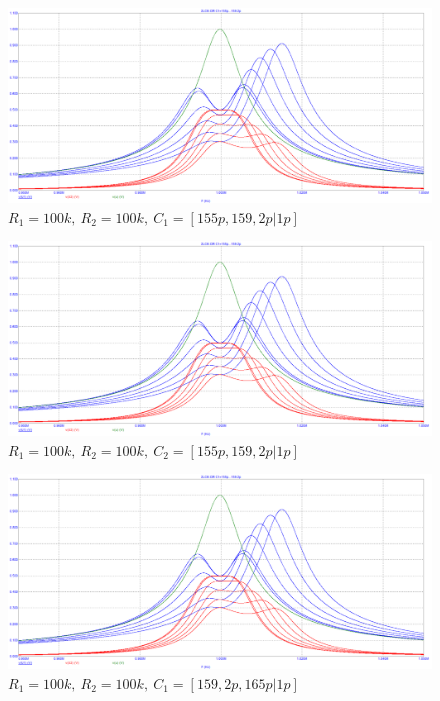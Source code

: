 \documentclass[a4paper, 12pt]{article}%
\begin{document}
\begin{enumerate}
\begin{figure}[h!]
\centering
\includegraphics[scale = 0.4]{images/plot2_5.png}
\caption{$R_1 = 100k, \: R_2 = 100k, \: C_1 = [155p, 159,2p | 1p]$}
\label{fig:Image1}
\end{figure}

\begin{figure}[h!]
\centering
\includegraphics[scale = 0.4]{images/plot2_5.png}
\caption{$R_1 = 100k, \: R_2 = 100k, \: C_2 = [155p, 159,2p | 1p]$}
\label{fig:Image1}
\end{figure}

\begin{figure}[h!]
\centering
\includegraphics[scale = 0.4]{images/plot2_5.png}
\caption{$R_1 = 100k, \: R_2 = 100k, \: C_1 = [159,2p, 165p | 1p]$}
\label{fig:Image1}
\end{figure}


\end{enumerate}
\end{document}
